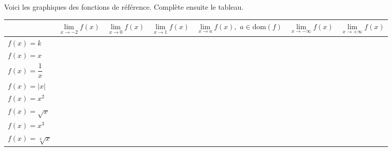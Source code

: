 \documentclass[a4paper,12pt]{report}
\newcommand{\dom}{\mathrm{dom}}
\newcommand{\pinf}{+\infty}
\newcommand{\minf}{-\infty}
\begin{document}
\begin{exercice}
Voici les graphiques des fonctions de référence. Complète ensuite le
tableau.

\begin{center}

\end{center}

\begin{center}
\begin{tabular}{l|l|l|l|l|l|l|}
\cline{2-7}
                                          & $\lim\limits_{x\to -2}f(x)$ & $\lim\limits_{x\to 0}f(x)$ & $\lim\limits_{x\to 1}f(x)$ & $\lim\limits_{x\to a}f(x),\,\,  a\in\dom(f)$ & $\lim\limits_{x\to \minf}f(x)$ & $\lim\limits_{x\to \pinf}f(x)$ \\ \hline
\multicolumn{1}{|l|}{$f(x)=k$}            &                             &                            &                            &                                            &                                &                                \\ \hline
\multicolumn{1}{|l|}{$f(x)=x$}            &                             &                            &                            &                                            &                                &                                \\ \hline
\multicolumn{1}{|l|}{\rule[-12pt]{0pt}{33pt}$f(x)=\dfrac{1}{x}$} &                             &                            &                            &                                            &                                &                                \\ \hline
\multicolumn{1}{|l|}{$f(x)=|x|$}          &                             &                            &                            &                                            &                                &                                \\ \hline
\multicolumn{1}{|l|}{$f(x)=x^2$}          &                             &                            &                            &                                            &                                &                                \\ \hline
\multicolumn{1}{|l|}{$f(x)=\sqrt{x}$}     &                             &                            &                            &                                            &                                &                                \\ \hline
\multicolumn{1}{|l|}{$f(x)=x^3$}          &                             &                            &                            &                                            &                                &                                \\ \hline
\multicolumn{1}{|l|}{$f(x)=\sqrt[3]{x}$}  &                             &                            &                            &                                            &                                &                                \\ \hline
\end{tabular}
\end{center}
\end{exercice}
\end{document}
